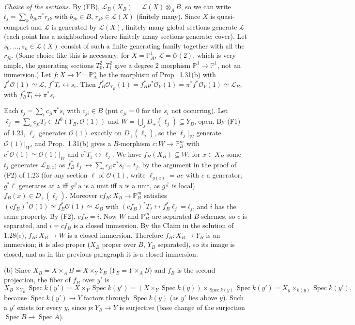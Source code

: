 \documentclass[11pt]{article}
\begin{document}
\emph{Choice of the sections.} By (FB), $\mathcal{L}_B(X_B)=\mathcal{L}(X)\otimes_AB$, so we can write $t_j=\sum_kb_{jk}\pi^*r_{jk}$ with $b_{jk}\in B$, $r_{jk}\in\mathcal{L}(X)$ (finitely many). Since $X$ is quasi-compact and $\mathcal{L}$ is generated by $\mathcal{L}(X)$, finitely many global sections generate $\mathcal{L}$ (each point has a neighborhood where finitely many sections generate; cover). Let $s_0,\dots,s_n\in\mathcal{L}(X)$ consist of such a finite generating family together with all the $r_{jk}$. (Some choice like this is necessary: for $X=\mathbb{P}^1_A$, $\mathcal{L}=\mathcal{O}(2)$, which is very ample, the generating sections $T_0^2,T_1^2$ give a degree $2$ morphism $\mathbb{P}^1\to\mathbb{P}^1$, not an immersion.) Let $f:X\to Y=\mathbb{P}^n_A$ be the morphism of Prop.~1.31(b) with $f^*\mathcal{O}(1)\simeq\mathcal{L}$, $f^*T_i\leftrightarrow s_i$. Then $f_B^*\mathcal{O}_{Y_B}(1)=f_B^*p^*\mathcal{O}_Y(1)=\pi^*f^*\mathcal{O}_Y(1)\simeq\mathcal{L}_B$, with $f_B^*T_i\leftrightarrow\pi^*s_i$.

Each $t_j=\sum_ic_{ji}\pi^*s_i$ with $c_{ji}\in B$ (put $c_{ji}=0$ for the $s_i$ not occurring). Let $\ell_j=\sum_ic_{ji}T_i\in H^0(Y_B,\mathcal{O}(1))$ and $W=\bigcup_jD_+(\ell_j)\subseteq Y_B$, open. By (F1) of 1.23, $\ell_j$ generates $\mathcal{O}(1)$ exactly on $D_+(\ell_j)$, so the $\ell_j|_W$ generate $\mathcal{O}(1)|_W$, and Prop.~1.31(b) gives a $B$-morphism $c:W\to\mathbb{P}^m_B$ with $c^*\mathcal{O}(1)\simeq\mathcal{O}(1)|_W$ and $c^*T_j\leftrightarrow\ell_j$. We have $f_B(X_B)\subseteq W$: for $x\in X_B$ some $t_j$ generates $\mathcal{L}_{B,x}$; as $f_B^*\ell_j\leftrightarrow\sum_ic_{ji}\pi^*s_i=t_j$, by the argument in the proof of (F2) of 1.23 (for any section $\ell$ of $\mathcal{O}(1)$, write $\ell_{g(z)}=ue$ with $e$ a generator; $g^*\ell$ generates at $z$ iff $g^\#u$ is a unit iff $u$ is a unit, as $g^\#$ is local) $f_B(x)\in D_+(\ell_j)$. Moreover $cf_B:X_B\to\mathbb{P}^m_B$ satisfies $(cf_B)^*\mathcal{O}(1)\simeq f_B^*\mathcal{O}(1)\simeq\mathcal{L}_B$ with $(cf_B)^*T_j\leftrightarrow f_B^*\ell_j=t_j$, and $i$ has the same property. By (F2), $cf_B=i$. Now $W$ and $\mathbb{P}^m_B$ are separated $B$-schemes, so $c$ is separated, and $i=cf_B$ is a closed immersion. By the Claim in the solution of 1.28(c), $f_B:X_B\to W$ is a closed immersion. Therefore $f_B:X_B\to Y_B$ is an immersion; it is also proper ($X_B$ proper over $B$, $Y_B$ separated), so its image is closed, and as in the previous paragraph it is a closed immersion.

(b) Since $X_B=X\times_AB=X\times_YY_B$ ($Y_B=Y\times_AB$) and $f_B$ is the second projection, the fiber of $f_B$ over $y'$ is
\[ X_B\times_{Y_B}\operatorname{Spec}k(y')=X\times_Y\operatorname{Spec}k(y')=(X\times_Y\operatorname{Spec}k(y))\times_{\operatorname{Spec}k(y)}\operatorname{Spec}k(y')=X_y\times_{k(y)}\operatorname{Spec}k(y'), \]
because $\operatorname{Spec}k(y')\to Y$ factors through $\operatorname{Spec}k(y)$ (as $y'$ lies above $y$). Such a $y'$ exists for every $y$, since $p:Y_B\to Y$ is surjective (base change of the surjection $\operatorname{Spec}B\to\operatorname{Spec}A$).
\end{document}
